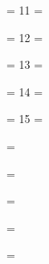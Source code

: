 \reseteqncount       %
\chapnum = 11        %
\firstcount=\pageno  %
 \blankpage

\reseteqncount       %
\chapnum = 12        %
\firstcount=\pageno  %
 \blankpage

\reseteqncount       %
\chapnum = 13        %
\firstcount=\pageno  %
 \blankpage

\reseteqncount       %
\chapnum = 14        %
\firstcount=\pageno  %


\reseteqncount       %
\chapnum = 15        %
\firstcount=\pageno  %


\reseteqncount       %
\firstcount=\pageno  %
 \blankpage

\reseteqncount       %
\firstcount=\pageno  %


\reseteqncount       %
\firstcount=\pageno  %
 \blankpage

\reseteqncount       %
\firstcount=\pageno  %
 \blankpage

\firstcount=\pageno  %
 \blankpage

\bye